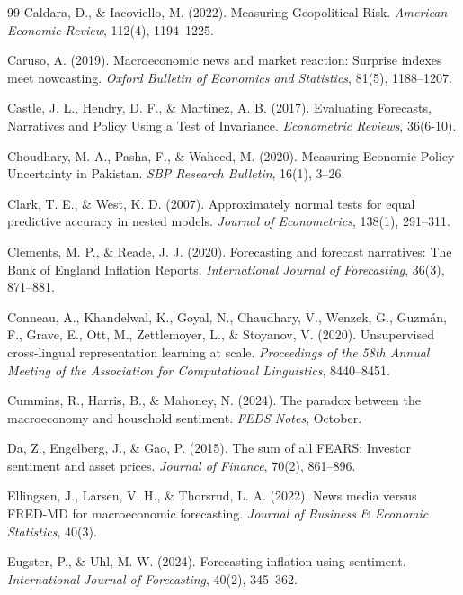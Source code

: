 \documentclass[12pt,oneside]{article}
\begin{document}
\begin{thebibliography}{99}
 Caldara, D., \& Iacoviello, M. (2022). Measuring Geopolitical Risk. \textit{American Economic Review}, 112(4), 1194--1225.

 Caruso, A. (2019). Macroeconomic news and market reaction: Surprise indexes meet nowcasting. \textit{Oxford Bulletin of Economics and Statistics}, 81(5), 1188--1207.

 Castle, J. L., Hendry, D. F., \& Martinez, A. B. (2017). Evaluating Forecasts, Narratives and Policy Using a Test of Invariance. \textit{Econometric Reviews}, 36(6-10).

 Choudhary, M. A., Pasha, F., \& Waheed, M. (2020). Measuring Economic Policy Uncertainty in Pakistan. \textit{SBP Research Bulletin}, 16(1), 3--26.

 Clark, T. E., \& West, K. D. (2007). Approximately normal tests for equal predictive accuracy in nested models. \textit{Journal of Econometrics}, 138(1), 291--311.

 Clements, M. P., \& Reade, J. J. (2020). Forecasting and forecast narratives: The Bank of England Inflation Reports. \textit{International Journal of Forecasting}, 36(3), 871--881.

 Conneau, A., Khandelwal, K., Goyal, N., Chaudhary, V., Wenzek, G., Guzmán, F., Grave, E., Ott, M., Zettlemoyer, L., \& Stoyanov, V. (2020). Unsupervised cross-lingual representation learning at scale. \textit{Proceedings of the 58th Annual Meeting of the Association for Computational Linguistics}, 8440--8451.

 Cummins, R., Harris, B., \& Mahoney, N. (2024). The paradox between the macroeconomy and household sentiment. \textit{FEDS Notes}, October.

 Da, Z., Engelberg, J., \& Gao, P. (2015). The sum of all FEARS: Investor sentiment and asset prices. \textit{Journal of Finance}, 70(2), 861--896.

 Ellingsen, J., Larsen, V. H., \& Thorsrud, L. A. (2022). News media versus FRED-MD for macroeconomic forecasting. \textit{Journal of Business \& Economic Statistics}, 40(3).

 Eugster, P., \& Uhl, M. W. (2024). Forecasting inflation using sentiment. \textit{International Journal of Forecasting}, 40(2), 345--362.


\end{thebibliography}
\end{document}
